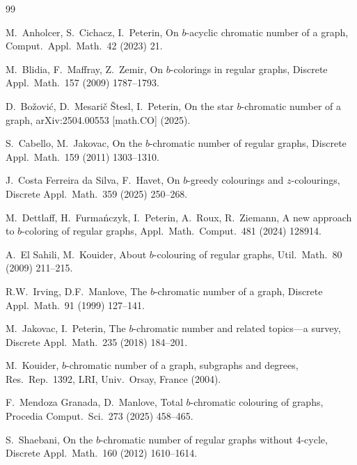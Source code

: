 \documentclass{article}
\theoremstyle{definition}
\begin{document}
\begin{thebibliography}{99}

M.~Anholcer, S.~Cichacz, I.~Peterin,
On $b$-acyclic chromatic number of a graph,
Comput.\ Appl.\ Math.\ 42 (2023) 21.

M.~Blidia, F.~Maffray, Z.~Zemir,
On $b$-colorings in regular graphs,
Discrete Appl.\ Math.\ 157 (2009) 1787--1793.

D.~Bo\v{z}ovi\'c, D.~Mesari\v{c} \v{S}tesl, I.~Peterin,
On the star $b$-chromatic number of a graph,
arXiv:2504.00553 [math.CO] (2025).

S.~Cabello, M.~Jakovac,
On the $b$-chromatic number of regular graphs,
Discrete Appl.\ Math.\ 159 (2011) 1303--1310.

J.~Costa Ferreira da Silva, F.~Havet,
On $b$-greedy colourings and $z$-colourings,
Discrete Appl.\ Math.\ 359 (2025) 250--268.

M.~Dettlaff, H.~Furma\'nczyk, I.~Peterin, A.~Roux, R.~Ziemann,
A new approach to $b$-coloring of regular graphs,
Appl.\ Math.\ Comput.\ 481 (2024) 128914.

A.~El Sahili, M.~Kouider,
About $b$-colouring of regular graphs,
Util.\ Math.\ 80 (2009) 211--215.

R.W.~Irving, D.F.~Manlove,
The $b$-chromatic number of a graph,
Discrete Appl.\ Math.\ 91 (1999) 127--141.

M.~Jakovac, I.~Peterin,
The $b$-chromatic number and related topics---a survey,
Discrete Appl.\ Math.\ 235 (2018) 184--201.

M.~Kouider,
$b$-chromatic number of a graph, subgraphs and degrees,
Res.\ Rep.\ 1392, LRI, Univ.\ Orsay, France (2004).

F.~Mendoza Granada, D.~Manlove,
Total $b$-chromatic colouring of graphs,
Procedia Comput.\ Sci.\ 273 (2025) 458--465.

S.~Shaebani,
On the $b$-chromatic number of regular graphs without 4-cycle,
Discrete Appl.\ Math.\ 160 (2012) 1610--1614.

\end{thebibliography}
\end{document}

